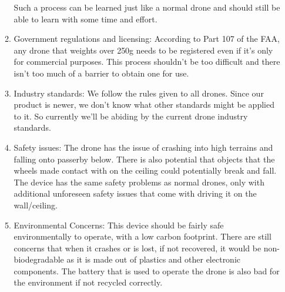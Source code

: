 \documentclass[12pt]{article}
\begin{document}
\begin{enumerate}[label=\Alph*.]
\begin{enumerate}[label=\roman*.]
                    Such a process can be learned just like a normal drone and should still be able to learn with some time and effort.
                    \item Government regulations and licensing: According to Part 107 of the FAA, any drone that weights over 250g needs to be registered even if it's only for commercial purposes.
                    This process shouldn't be too difficult and there isn't too much of a barrier to obtain one for use.
                    \item Industry standards: We follow the rules given to all drones.
                    Since our product is newer, we don't know what other standards might be applied to it.
                    So currently we'll be abiding by the current drone industry standards.
                    \item Safety issues: The drone has the issue of crashing into high terrains and falling onto passerby below.
                    There is also potential that objects that the wheels made contact with on the ceiling could potentially break and fall.
                    The device has the same safety problems as normal drones, only with additional unforeseen safety issues that come with driving it on the wall/ceiling.
                    \item Environmental Concerns: This device should be fairly safe environmentally to operate, with a low carbon footprint.
                    There are still concerns that when it crashes or is lost, if not recovered, it would be non-biodegradable as it is made out of plastics and other electronic components.
                    The battery that is used to operate the drone is also bad for the environment if not recycled correctly.
                \end{enumerate}
            \end{enumerate}
        \newpage
\end{document}
